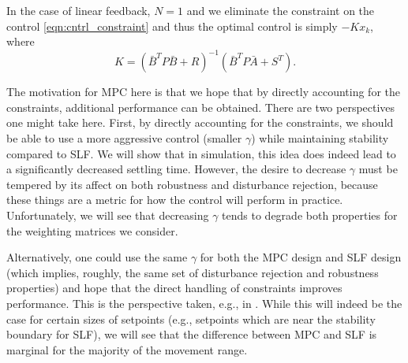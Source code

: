 \documentclass[twocolumn,twoside]{IEEEtran}
\newcommand{\Ad}{\ensuremath{\bar A }\xspace}
\newcommand{\Bd}{\ensuremath{\bar B }\xspace}
\begin{document}
In the case of linear feedback, $N=1$ and we eliminate the constraint on the control \eqref{eqn:cntrl_constraint} and thus the optimal control is simply $-Kx_k$, where
\begin{equation}
  K = (\Bd^TP\Bd + R)^{-1}(\Bd^TP\Ad + S^T).
\end{equation}

The motivation for MPC here is that we hope that by directly accounting for the constraints, additional performance can be obtained. There are two perspectives one might take here. First, by directly accounting for the constraints, we should be able to use a more aggressive control (smaller $\gamma$) while maintaining stability compared to SLF.
We will show that in simulation, this idea does indeed lead to a significantly decreased settling time. However, the desire to decrease $\gamma$ must be tempered by its affect on both robustness and disturbance rejection, because these things are a metric for how the control will perform in practice. Unfortunately, we will see that decreasing $\gamma$ tends to degrade both properties for the weighting matrices we consider. 

Alternatively, one could use the same $\gamma$ for both the MPC design and SLF design (which implies, roughly,  the same set of disturbance rejection and robustness properties) and hope that the direct handling of constraints improves performance. This is the perspective taken, e.g., in \cite{Wills_CDC_2005}. While this will indeed be the case for certain sizes of setpoints (e.g., setpoints which are near the stability boundary for SLF), we will see that the difference between MPC and SLF is marginal for the majority of the movement range.

\end{document}
